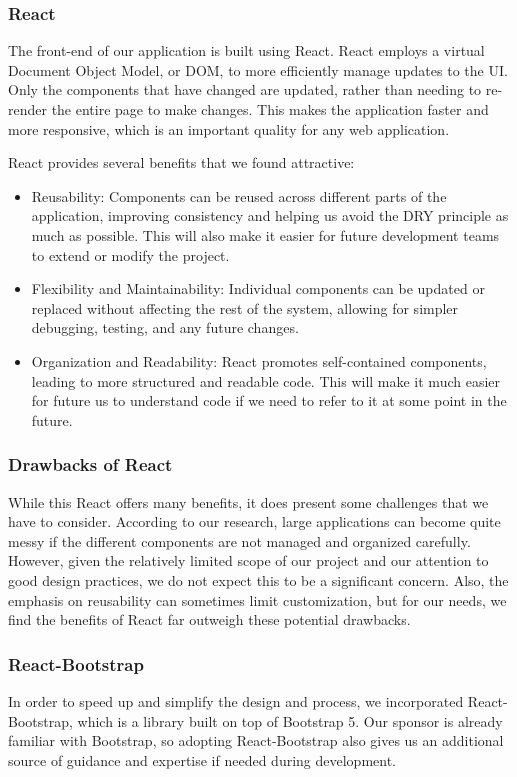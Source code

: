 \documentclass[12pt]{article}
\begin{document}
\subsubsection{React}
The front-end of our application is built using React. React employs a virtual Document Object Model, or DOM, to more efficiently manage updates to the UI. Only the components that have changed are updated, rather than needing to re-render the entire page to make changes. This makes the application faster and more responsive, which is an important quality for any web application.

React provides several benefits that we found attractive:
\begin{itemize}
	\item Reusability: Components can be reused across different parts of the application, improving consistency and helping us avoid the DRY principle as much as possible. This will also make it easier for future development teams to extend or modify the project.
	\item Flexibility and Maintainability: Individual components can be updated or replaced without affecting the rest of the system, allowing for simpler debugging, testing, and any future changes. 
	\item Organization and Readability: React promotes self-contained components, leading to more structured and readable code. This will make it much easier for future us to understand code if we need to refer to it at some point in the future.
\end{itemize}

\subsubsection{Drawbacks of React}
While this React offers many benefits, it does present some challenges that we have to consider. According to our research, large applications can become quite messy if the different components are not managed and organized carefully. However, given the relatively limited scope of our project and our attention to good design practices, we do not expect this to be a significant concern. Also, the emphasis on reusability can sometimes limit customization, but for our needs, we find the benefits of React far outweigh these potential drawbacks.

\subsubsection{React-Bootstrap}
In order to speed up and simplify the design and process, we incorporated React-Bootstrap, which is a library built on top of Bootstrap 5. Our sponsor is already familiar with Bootstrap, so adopting React-Bootstrap also gives us an additional source of guidance and expertise if needed during development.
\end{document}
